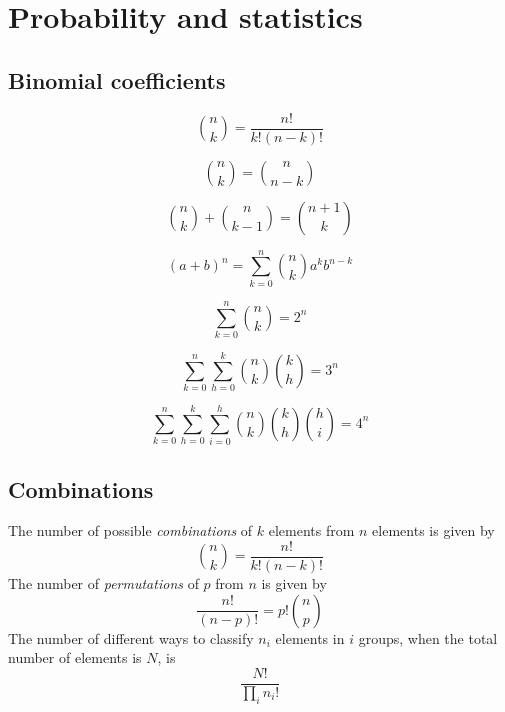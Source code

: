 \documentclass[../formulario.tex]{subfiles}
\begin{document}
\chapter{Probability and statistics}

\section{Binomial coefficients}
\begin{multicols}{3}
	
	\[ \binom{n}{k} = \frac{n!}{k!(n-k)!} \]
	
	\[ \binom{n}{k} = \binom{n}{n-k} \]
	
	\[ \binom{n}{k} + \binom{n}{k-1} = \binom{n+1}{k} \]
	
	\[ (a+b)^n = \sum_{k=0}^{n}\binom{n}{k}a^kb^{n-k} \]
	
	\[ \sum_{k=0}^{n}\binom{n}{k} = 2^n \]
	
	\[ \sum_{k=0}^{n}\sum_{h=0}^{k}\binom{n}{k}\binom{k}{h} = 3^n \]
	
	\[ \sum_{k=0}^{n}\sum_{h=0}^{k}\sum_{i=0}^{h}\binom{n}{k}\binom{k}{h}\binom{h}{i} = 4^n \]
	
\end{multicols}

\section{Combinations}
The number of possible {\it combinations} of $k$ elements from $n$ elements is
given by
\[
{n\choose k}=\frac{n!}{k!(n-k)!}
\]
The number of {\it permutations} of $p$ from $n$ is given by
\[
\frac{n!}{(n-p)!}=p!{n\choose p}
\]
The number of different ways to classify $n_i$ elements in $i$ groups, when
the total number of elements is $N$, is
\[
\frac{N!}{\prod\limits_i n_i!}
\]
\end{document}
